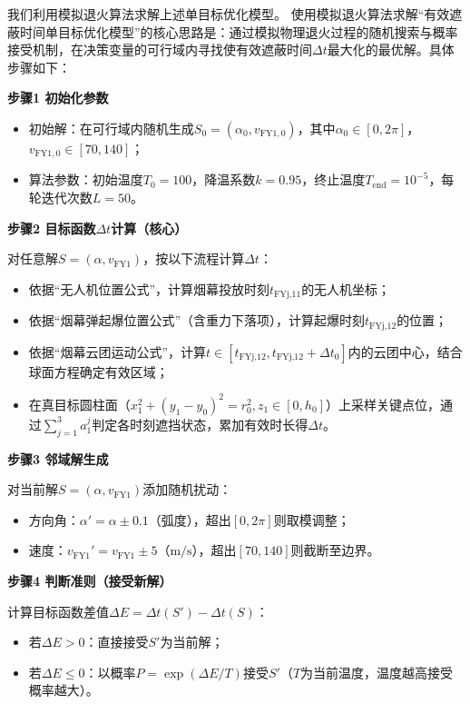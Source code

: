 \documentclass[../main.tex]{subfiles}
\begin{document}

我们利用模拟退火算法求解上述单目标优化模型。
使用模拟退火算法求解“有效遮蔽时间单目标优化模型”的核心思路是：通过模拟物理退火过程的随机搜索与概率接受机制，在决策变量的可行域内寻找使有效遮蔽时间$\Delta t$最大化的最优解。具体步骤如下：

\noindent\textbf{步骤1 初始化参数}
\begin{itemize}
    \item 初始解：在可行域内随机生成$S_0=(\alpha_0, v_{\text{FY1},0})$，其中$\alpha_0 \in [0,2\pi]$，$v_{\text{FY1},0} \in [70,140]$；
    \item 算法参数：初始温度$T_0=100$，降温系数$k=0.95$，终止温度$T_{\text{end}}=10^{-5}$，每轮迭代次数$L=50$。
\end{itemize}

\noindent\textbf{步骤2 目标函数$\Delta t$计算（核心）}

对任意解$S=(\alpha, v_{\text{FY1}})$，按以下流程计算$\Delta t$：
\begin{itemize}
    \item 依据“无人机位置公式”，计算烟幕投放时刻$t_{\text{FYj,11}}$的无人机坐标；
    \item 依据“烟幕弹起爆位置公式”（含重力下落项），计算起爆时刻$t_{\text{FYj,12}}$的位置；
    \item 依据“烟幕云团运动公式”，计算$t \in [t_{\text{FYj,12}}, t_{\text{FYj,12}}+\Delta t_0]$内的云团中心，结合球面方程确定有效区域；
    \item 在真目标圆柱面（$x_1^2+(y_1-y_0)^2=r_0^2, z_1 \in [0,h_0]$）上采样关键点位，通过$\sum_{j=1}^3 a_1^j$判定各时刻遮挡状态，累加有效时长得$\Delta t$。
\end{itemize}

\noindent\textbf{步骤3 邻域解生成}

对当前解$S=(\alpha, v_{\text{FY1}})$添加随机扰动：
\begin{itemize}
    \item 方向角：$\alpha' = \alpha \pm 0.1$（弧度），超出$[0,2\pi]$则取模调整；
    \item 速度：$v_{\text{FY1}}' = v_{\text{FY1}} \pm 5$（$\text{m/s}$），超出$[70,140]$则截断至边界。
\end{itemize}

\noindent\textbf{步骤4  判断准则（接受新解）}

计算目标函数差值$\Delta E = \Delta t(S') - \Delta t(S)$：
\begin{itemize}
    \item 若$\Delta E > 0$：直接接受$S'$为当前解；
    \item 若$\Delta E \leq 0$：以概率$P = \exp(\Delta E/T)$接受$S'$（$T$为当前温度，温度越高接受概率越大）。
\end{itemize}
\end{document}
